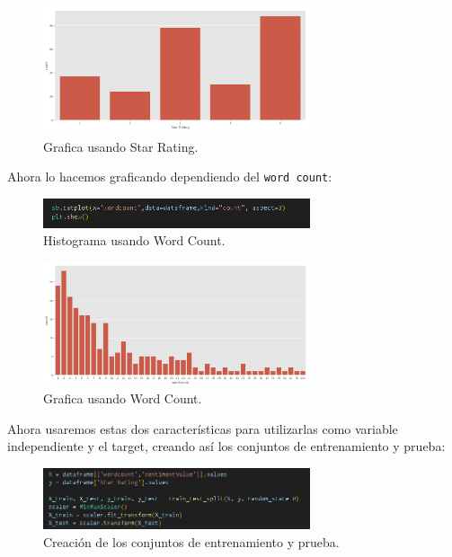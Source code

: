 \documentclass{article}
\begin{document}
\begin{figure}[H]
    \centering
    \includegraphics[width=0.7\textwidth]{img/10.png}
    \caption{Grafica usando Star Rating.}
\end{figure}

Ahora lo hacemos graficando dependiendo del \texttt{word count}:

\begin{figure}[H]
    \centering
    \includegraphics[width=0.7\textwidth]{img/11.png}
    \caption{Histograma usando Word Count.}
\end{figure}

\begin{figure}[H]
    \centering
    \includegraphics[width=0.7\textwidth]{img/12.png}
    \caption{Grafica usando Word Count.}
\end{figure}

Ahora usaremos estas dos características para utilizarlas como variable independiente y el target, creando así los conjuntos de entrenamiento y prueba:

\begin{figure}[H]
    \centering
    \includegraphics[width=0.7\textwidth]{img/13.png}
    \caption{Creación de los conjuntos de entrenamiento y prueba.}
\end{figure}
\end{document}
